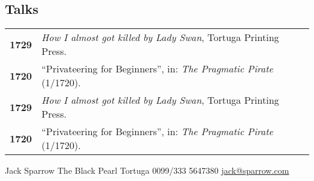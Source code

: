 \documentclass[bluebeige]{hipstercv}
\newlength{\rightcolwidth}
\begin{document}
\begin{paracol}{2}
\begin{minipage}[t]{0.3\textwidth}
\section*{Talks}
\begin{tabular}{>{\footnotesize\bfseries}r >{\footnotesize}p{}}
    1729 & \emph{How I almost got killed by Lady Swan}, Tortuga Printing Press. \\
    1720 & ``Privateering for Beginners'', in: \emph{The Pragmatic Pirate} (1/1720). \\
    1729 & \emph{How I almost got killed by Lady Swan}, Tortuga Printing Press. \\
    1720 & ``Privateering for Beginners'', in: \emph{The Pragmatic Pirate} (1/1720).
\end{tabular}

\end{minipage}

\vspace{5em}

 \hfill
{} \hfill
{} \hfill
{}



\vspace{3em}


\vfill{} %

\setlength{\parindent}{0pt}
\begin{minipage}[t]{\rightcolwidth}
\begin{center}\fontfamily{\sfdefault}\selectfont \color{black!70}
{\small Jack Sparrow  The Black Pearl  Tortuga  0099/333 5647380 \newline{} \protect\url{jack@sparrow.com}
}
\end{center}
\end{minipage}


\end{paracol}
\end{document}
